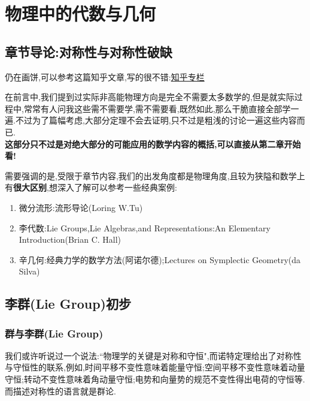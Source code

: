 \setchapterpreamble[u]{\margintoc}
\chapter{物理中的代数与几何}


\section*{章节导论:对称性与对称性破缺}
仍在画饼,可以参考这篇知乎文章,写的很不错:\href{https://zhuanlan.zhihu.com/p/338221764}{知乎专栏}

在前言中,我们提到过实际非高能物理方向是完全不需要太多数学的,但是就实际过程中,常常有人问我这些需不需要学,需不需要看,既然如此,那么干脆直接全部学一遍.不过为了篇幅考虑,大部分定理不会去证明,只不过是粗浅的讨论一遍这些内容而已.\\
\textbf{这部分只不过是对绝大部分的可能应用的数学内容的概括,可以直接从第二章开始看!}

需要强调的是,受限于章节内容,我们的出发角度都是物理角度,且较为狭隘和数学上有\textbf{很大区别},想深入了解可以参考一些经典案例:
\begin{enumerate}
    \item 微分流形:流形导论(Loring W.Tu)
    \item 李代数:Lie Groups,Lie Algebras,and Representations:An Elementary Introduction(Brian C. Hall)
    \item 辛几何:经典力学的数学方法(阿诺尔德);Lectures on Symplectic Geometry(da Silva)
\end{enumerate}

\section{李群(Lie Group)初步}
\subsection{群与李群(Lie Group)}
我们或许听说过一个说法:``物理学的关键是对称和守恒",而诺特定理给出了对称性与守恒性的联系,例如,时间平移不变性意味着能量守恒;空间平移不变性意味着动量守恒;转动不变性意味着角动量守恒;电势和向量势的规范不变性得出电荷的守恒等.而描述对称性的语言就是群论.


